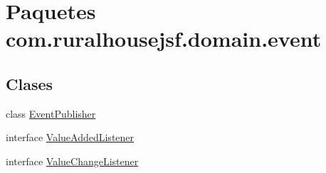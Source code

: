 \hypertarget{namespacecom_1_1ruralhousejsf_1_1domain_1_1event}{}\section{Paquetes com.\+ruralhousejsf.\+domain.\+event}
\label{namespacecom_1_1ruralhousejsf_1_1domain_1_1event}
\subsection*{Clases}
\begin{DoxyCompactItemize}
\item 
class \mbox{\hyperlink{classcom_1_1ruralhousejsf_1_1domain_1_1event_1_1_event_publisher}{Event\+Publisher}}
\item 
interface \mbox{\hyperlink{interfacecom_1_1ruralhousejsf_1_1domain_1_1event_1_1_value_added_listener}{Value\+Added\+Listener}}
\item 
interface \mbox{\hyperlink{interfacecom_1_1ruralhousejsf_1_1domain_1_1event_1_1_value_change_listener}{Value\+Change\+Listener}}
\end{DoxyCompactItemize}
